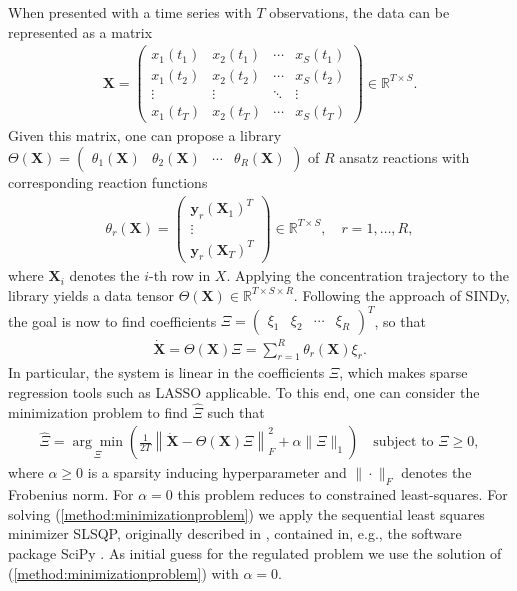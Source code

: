 \documentclass[oneside, abstracton, titlepage]{scrartcl}
\begin{document}
	When presented with a time series with $T$ observations, the data can be represented as a matrix
	\begin{align}
	\textbf{X} = \begin{pmatrix}
		x_1(t_1) & x_2(t_1) & \cdots & x_S(t_1) \\
		x_1(t_2) & x_2(t_2) & \cdots & x_S(t_2) \\
		\vdots   & \vdots   & \ddots & \vdots   \\
		x_1(t_T) & x_2(t_T) & \cdots & x_S(t_T)
	\end{pmatrix} \in \mathbb{R}^{T\times S}.
	\end{align}
	Given this matrix, one can propose a library $\Theta(\textbf{X}) = \begin{pmatrix} \theta_1(\textbf{X}) & \theta_2(\textbf{X}) & \cdots & \theta_R(\textbf{X}) \end{pmatrix}$ of $R$ ansatz reactions with corresponding reaction functions
	\begin{align}
	\theta_r(\textbf{X}) = \begin{pmatrix}
	\textbf{y}_r(\textbf{X}_1)^T \\ \vdots \\ \textbf{y}_r(\textbf{X}_T)^T
	\end{pmatrix}\in \mathbb{R}^{T\times S},\quad r=1,\ldots,R,
	\end{align}
	where $\textbf{X}_i$ denotes the $i$-th row in $X$. Applying the concentration trajectory to the library yields a data tensor $\Theta(\textbf{X})\in\mathbb{R}^{T\times S\times R}$. Following the approach of SINDy, the goal is now to find coefficients $\Xi = \begin{pmatrix} \xi_1 & \xi_2 & \cdots & \xi_R
	\end{pmatrix}^T$, so that
	\begin{align}
	\dot{\textbf{X}} = \Theta(\textbf{X})\Xi = \sum_{r=1}^{R}\theta_r(\textbf{X})\xi_r.
	\end{align}
	In particular, the system is linear in the coefficients $\Xi$, which makes sparse regression tools such as LASSO \cite{Tibshirani1996, Hastie2009} applicable. To this end, one can consider the minimization problem to find $\hat{\Xi}$ such that
	\begin{align}
		\hat{\Xi} = \underset{\Xi}{\arg\min}\left( \frac{1}{2T}\left\| \dot{\textbf{X}} - \Theta(\textbf{X})\Xi \right\|_F^2 + \alpha\|\Xi\|_1 \right) \quad \text{subject to }\Xi \geq 0,
	\label{method:minimizationproblem}\end{align}
	where $\alpha\geq 0$ is a sparsity inducing hyperparameter and $\|\cdot\|_F$ denotes the Frobenius norm. For $\alpha=0$ this problem reduces to constrained least-squares. For solving (\ref{method:minimizationproblem}) we apply the sequential least squares minimizer SLSQP, originally described in \cite{Kraft1988}, contained in, e.g., the software package SciPy \cite{SciPy}. As initial guess for the regulated problem we use the solution of (\ref{method:minimizationproblem}) with $\alpha=0$.
	
\end{document}
